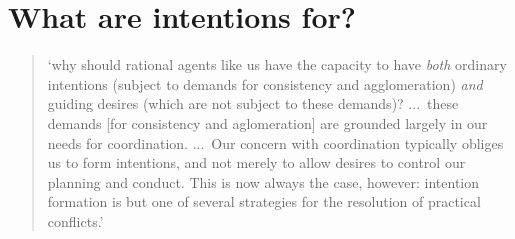 \documentclass[12pt,\papersize]{extarticle}
\begin{document}
\section{What are intentions for?}

\begin{quote}
`why should rational agents like us have the capacity to have \emph{both} ordinary intentions (subject to demands for consistency and agglomeration) \emph{and} guiding desires (which are not subject to these demands)?
...\ these demands [for consistency and aglomeration] are grounded largely in our needs for coordination.
...\
Our concern with coordination typically obliges us to form intentions, and not merely to allow desires to control our planning and conduct.
This is now always the case, however: intention formation is but one of several strategies for the resolution of practical conflicts.'
\citep[pp.\ 137--8]{Bratman:1987xw}
\end{quote}


\small

\end{document}
